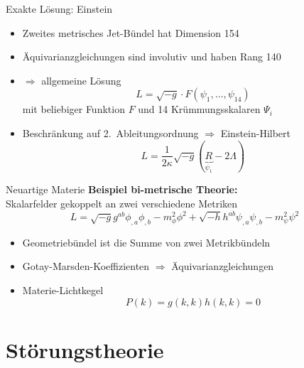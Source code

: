\documentclass{beamer}
\begin{document}
    \begin{frame}{Exakte Lösung: Einstein}
        \begin{itemize}
            \item Zweites metrisches Jet-Bündel hat Dimension 154
            \item Äquivarianzgleichungen sind involutiv und haben Rang 140
            \item $\Rightarrow$ allgemeine Lösung
            \[ L = \sqrt{-g} \cdot F(\psi_1,\ldots,\psi_{14}) \]
            mit beliebiger Funktion $F$ und 14 Krümmungsskalaren $\Psi_i$
            \item Beschränkung auf 2.\ Ableitungsordnung $\Rightarrow$ \alert{Einstein-Hilbert}
            \[ L = \frac{1}{2\kappa}\sqrt{-g}(\underbrace{R}_{\psi_1} - 2\Lambda)\]
        \end{itemize}
    \end{frame}

    \begin{frame}{Neuartige Materie}
        \textbf{Beispiel bi-metrische Theorie:}\\ Skalarfelder gekoppelt an zwei verschiedene Metriken
            {\setlength{\belowdisplayskip}{-5pt}
        \[ L = \sqrt{-g} g^{ab} \phi_{,a}\phi_{,b} - m_\phi^2 \phi^2 + \sqrt{-h} h^{ab} \psi_{,a}\psi_{,b} - m_\psi^2 \psi^2 \]} \pause
        \begin{itemize}
            \item Geometriebündel ist die Summe von zwei Metrikbündeln
            \item Gotay-Marsden-Koeffizienten $\Rightarrow$ Äquivarianzgleichungen
            \item Materie-Lichtkegel
            \[ P(k) = g(k,k) h(k,k) = 0 \]
        \end{itemize}
    \end{frame}


    \section{Störungstheorie}\label{sec:stoerungstheorie}
\end{document}
